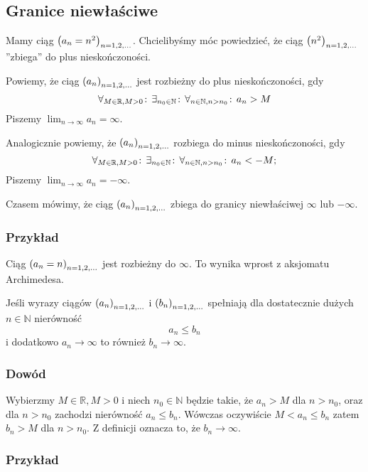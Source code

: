 \documentclass[9pt]{article}
\begin{document}
\subsection{Granice niewłaściwe}

Mamy ciąg $\left(a_n = n^2\right)_{n = 1,2,...}$. Chcielibyśmy móc powiedzieć, że ciąg $\left(n^2\right)_{n = 1,2,...}$ ''zbiega'' do plus
nieskończoności.

\begin{Def}
    Powiemy, że ciąg $\left(a_n\right)_{n = 1,2,...}$ jest rozbieżny do plus nieskończoności, gdy
    \[
        \forall_{M \in \mathbb{R}, M > 0} \! : \,\exists_{n_0 \in \mathbb{N}} \! : \, \forall_{n \in \mathbb{N}, n > n_0} \! : \, a_n > M
    \]
    Piszemy $\lim_{n \to \infty} a_n = \infty$.
\end{Def}

\begin{Def}
    Analogicznie powiemy, że $\left(a_n\right)_{n = 1,2,...}$ rozbiega do minus nieskończoności, gdy
    \[
        \forall_{M \in \mathbb{R}, M > 0} \! : \, \exists_{n_0 \in \mathbb{N}} \! : \, \forall_{n\in \mathbb{N}, n > n_0} \! : \, a_n <
        -M;
    \]
    Piszemy $\lim_{n \to \infty} a_n = -\infty$.
\end{Def}

Czasem mówimy, że ciąg $\left(a_n\right)_{n = 1,2,...}$ zbiega do granicy niewłaściwej $\infty$ lub $-\infty$.

\subsubsection*{Przykład}

Ciąg $\left(a_n = n\right)_{n = 1,2,...}$ jest rozbieżny do $\infty$. To wynika wprost z aksjomatu Archimedesa.

\begin{Twi}
    Jeśli wyrazy ciągów $\left(a_n\right)_{n = 1,2,...}$ i $\left(b_n\right)_{n = 1,2,...}$ spełniają dla dostatecznie dużych $n \in
    \mathbb{N}$ nierówność
    \[
        a_n \le b_n
    \]
    i dodatkowo $a_n \to \infty$ to również $b_n \to \infty$.
\end{Twi}

\subsubsection*{Dowód}

Wybierzmy $M \in \mathbb{R}, M > 0$ i niech $n_0 \in \mathbb{N}$ będzie takie, że $a_n > M$ dla $n >
n_0$, oraz dla $n > n_0$ zachodzi nierówność $a_n \le b_n$. Wówczas oczywiście $M < a_n \le b_n$
zatem $b_n > M$ dla $n > n_0$. Z definicji oznacza to, że $b_n \to \infty$.

\subsubsection*{Przykład}
\end{document}
